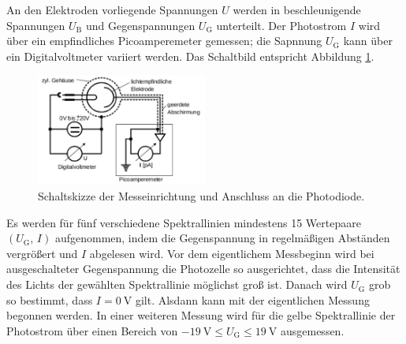 An den Elektroden vorliegende Spannungen $U$ werden in beschleunigende Spannungen $U_\text{B}$ und Gegenspannungen $U_\text{G}$
unterteilt.
Der Photostrom $I$ wird über ein empfindliches Picoamperemeter gemessen; die Sapnnung $U_\mathup{G}$ kann über ein Digitalvoltmeter variiert werden. 
Das Schaltbild entspricht Abbildung \ref{fig:schaltbild}. 

\begin{figure}[h]
	\centering
	\includegraphics[width=0.5\textwidth]{Bilder/Schaltbild.pdf}
	\caption{Schaltskizze der Messeinrichtung und Anschluss an die Photodiode. \cite{skript}}
	\label{fig:schaltbild}
\end{figure}
Es werden für fünf verschiedene Spektrallinien mindestens 15 Wertepaare $\left(U_\mathup{G},\,I\right)$ aufgenommen, indem die Gegenspannung in regelmäßigen Abständen vergrößert und $I$ abgelesen wird.
Vor dem  eigentlichem Messbeginn wird bei ausgeschalteter Gegenspannung die Photozelle so ausgerichtet, dass die Intensität des Lichts der gewählten Spektrallinie möglichst groß ist. 
Danach wird $U_\mathup{G}$ grob so bestimmt, dass $I=\SI{0}{\volt}$ gilt. 
Alsdann kann mit der eigentlichen Messung begonnen werden.
In einer weiteren Messung wird für die gelbe Spektrallinie der Photostrom über einen Bereich von $\SI{-19}{\volt}\leqslant U_\mathup{G}\leqslant \SI{19}{\volt}$ ausgemessen.
\newpage